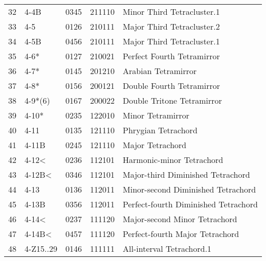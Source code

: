 \begin{table}[h]
\begin{tabular}{lllll}
32 & 4-4B                           & 0345  & 211110          & Minor Third Tetracluster.1                        \\
33 & 4-5                            & 0126  & 210111          & Major Third Tetracluster.2                        \\
34 & 4-5B                           & 0456  & 210111          & Major Third Tetracluster.1                        \\
35 & 4-6*                           & 0127  & 210021          & Perfect Fourth Tetramirror                        \\
36 & 4-7*                           & 0145  & 201210          & Arabian Tetramirror                               \\
37 & 4-8*                           & 0156  & 200121          & Double Fourth Tetramirror                         \\
38 & 4-9*(6)                        & 0167  & 200022          & Double Tritone Tetramirror                        \\
39 & 4-10*                          & 0235  & 122010          & Minor Tetramirror                                 \\
40 & 4-11                           & 0135  & 121110          & Phrygian Tetrachord                               \\
41 & 4-11B                          & 0245  & 121110          & Major Tetrachord                                  \\
42 & 4-12\textless                  & 0236  & 112101          & Harmonic-minor Tetrachord                         \\
43 & 4-12B\textless                 & 0346  & 112101          & Major-third Diminished Tetrachord                 \\
44 & 4-13                           & 0136  & 112011          & Minor-second Diminished Tetrachord                \\
45 & 4-13B                          & 0356  & 112011          & Perfect-fourth Diminished Tetrachord              \\
46 & 4-14\textless                  & 0237  & 111120          & Major-second Minor Tetrachord                     \\
47 & 4-14B\textless                 & 0457  & 111120          & Perfect-fourth Major Tetrachord                   \\
48 & 4-Z15..29                      & 0146  & 111111          & All-interval Tetrachord.1                         \\

\end{tabular}
\end{table}
